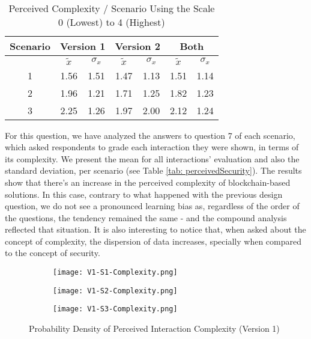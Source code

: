 \begin{table}[htb]
	\centering
	\caption{Perceived Complexity / Scenario Using the Scale 0 (Lowest) to 4 (Highest)}
	\label{tab: perceivedComplexity}
	\begin{tabular}{c|cccc|cc}
		\hline
		Scenario & \multicolumn{2}{c}{\bf Version 1} & \multicolumn{2}{c}{\bf Version 2} \vrule & \multicolumn{2}{c}{\bf Both}                                             \\
		\hline
		         & $\tilde{x}$                       & $\sigma_{x}$                             & $\tilde{x}$                  & $\sigma_{x}$ & $\tilde{x}$ & $\sigma_{x}$ \\
		\hline
		1        & 1.56                              & 1.51                                     & 1.47                         & 1.13         & 1.51        & 1.14         \\
		2        & 1.96                              & 1.21                                     & 1.71                         & 1.25         & 1.82        & 1.23         \\
		3        & 2.25                              & 1.26                                     & 1.97                         & 2.00         & 2.12        & 1.24         \\
		\hline
	\end{tabular}
\end{table}

For this question, we have analyzed the answers to question 7 of each scenario, which asked respondents to grade each interaction they were shown, in terms of its complexity. We present the mean for all interactions' evaluation and also the standard deviation, per scenario (see Table \ref{tab: perceivedSecurity}). The results show that there's an increase in the perceived complexity of blockchain-based solutions. In this case, contrary to what happened with the previous design question, we do not see a pronounced learning bias as, regardless of the order of the questions, the tendency remained the same - and the compound analysis reflected that situation. It is also interesting to notice that, when asked about the concept of complexity, the dispersion of data increases, specially when compared to the concept of security.

\begin{figure}[htb]
	\centering
	\begin{subfigure}[b]{0.49\textwidth}
		\centering
		\texttt{[image: V1-S1-Complexity.png]}
	\end{subfigure}
	\begin{subfigure}[b]{0.49\textwidth}
		\centering
		\texttt{[image: V1-S2-Complexity.png]}
	\end{subfigure}
	\hfill
	\begin{subfigure}[b]{0.49\textwidth}
		\centering
		\texttt{[image: V1-S3-Complexity.png]}
	\end{subfigure}

	\caption{Probability Density of Perceived Interaction Complexity (Version 1)}
	\label{fig: perceivedInteractionComplexityOne}
\end{figure}

